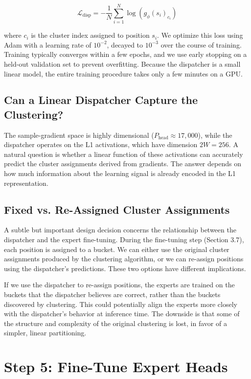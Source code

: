 \[\mathcal{L}_{\text{disp}} = -\frac{1}{N} \sum_{i=1}^N \log (g_\phi(s_i)_{c_i})\]

where $c_i$ is the cluster index assigned to position $s_i$. We optimize this loss using Adam with a learning rate of $10^{-2}$, decayed to $10^{-3}$ over the course of training. Training typically converges within a few epochs, and we use early stopping on a held-out validation set to prevent overfitting. Because the dispatcher is a small linear model, the entire training procedure takes only a few minutes on a GPU.


\subsection{Can a Linear Dispatcher Capture the Clustering?}

The sample-gradient space is highly dimensional ($P_{\text{head}} \approx 17,000$), while the dispatcher operates on the L1 activations, which have dimension $2W = 256$. A natural question is whether a linear function of these activations can accurately predict the cluster assignments derived from gradients. The answer depends on how much information about the learning signal is already encoded in the L1 representation.


\subsection{Fixed vs. Re-Assigned Cluster Assignments}

A subtle but important design decision concerns the relationship between the dispatcher and the expert fine-tuning. During the fine-tuning step (Section 3.7), each position is assigned to a bucket. We can either use the original cluster assignments produced by the clustering algorithm, or we can re-assign positions using the dispatcher's predictions. These two options have different implications.

If we use the dispatcher to re-assign positions, the experts are trained on the buckets that the dispatcher believes are correct, rather than the buckets discovered by clustering. This could potentially align the experts more closely with the dispatcher's behavior at inference time. The downside is that some of the structure and complexity of the original clustering is lost, in favor of a simpler, linear partitioning.



\section{Step 5: Fine-Tune Expert Heads}

